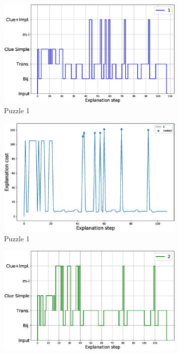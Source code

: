 \begin{figure}
	\centering
	\begin{subfigure}{.5\textwidth}
		\centering
		\includegraphics[width=0.9\linewidth]{figures/plot_cost_steps_1.eps}
		\caption{Puzzle 1}
		\label{fig:composition_puzzle:p1}
	\end{subfigure}%
	\begin{subfigure}{.5\textwidth}
		\centering
		\includegraphics[width=0.84\linewidth]{figures/1.eps}
		\caption{Puzzle 1}
		\label{fig:cost_puzzle:p1}
	\end{subfigure}
	\begin{subfigure}{.5\textwidth}
		\centering
		\includegraphics[width=0.9\linewidth]{figures/plot_cost_steps_2.eps}

\end{subfigure}
\end{figure}
